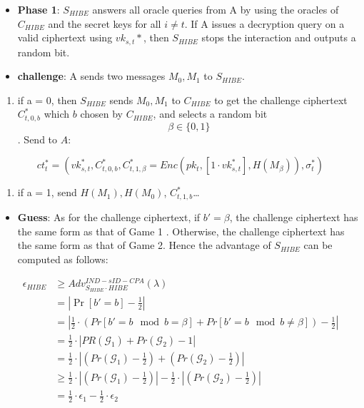 \documentclass[
]{article}
\providecommand{\tightlist}{%
  \setlength{\itemsep}{0pt}\setlength{\parskip}{0pt}}
\begin{document}
\begin{itemize}
\item
  \textbf{Phase 1}: \(S_{HIBE}\) answers all oracle queries from A by
  using the oracles of \(C_{HIBE}\) and the secret keys for all
  \(i \neq t\). If A issues a decryption query on a valid ciphertext
  using \(vk_{s,t}*\), then \(S_{HIBE}\) stops the interaction and
  outputs a random bit.
\item
  \textbf{challenge}: A sends two messages \(M_0, M_1\) to \(S_{HIBE}\).
\end{itemize}

\begin{enumerate}
\def\labelenumi{\arabic{enumi}.}
\tightlist
\item
  if a = 0, then \(S_{HIBE}\) sends \(M_0,M_1\) to \(C_{HIBE}\) to get
  the challenge ciphertext \(C_{t,0,b}^*\) which \(b\) chosen by
  \(C_{HIBE}\), and selects a random bit \[\beta \in \{0, 1\}\]. Send to
  \(A\):
\end{enumerate}

\[
ct_t^* = (vk_{s,t}^*, C_{t,0,b}^*, C_{t,1,\beta}^*= Enc(pk_t,[1\cdot vk_{s,t}^*],H(M_\beta)), \sigma_t^*)
\]

\begin{enumerate}
\def\labelenumi{\arabic{enumi}.}
\setcounter{enumi}{1}
\tightlist
\item
  if a = 1, send \(H(M_1), H(M_0)\), \(C_{t,1,b}^*\)\ldots{}
\end{enumerate}

\begin{itemize}
\tightlist
\item
  \textbf{Guess}: As for the challenge ciphertext, if \(b'=\beta\), the
  challenge ciphertext has the same form as that of Game 1 . Otherwise,
  the challenge ciphertext has the same form as that of Game 2. Hence
  the advantage of \(S_{HIBE}\) can be computed as follows:
\end{itemize}

\[
\begin{equation}
\begin{aligned}
\epsilon_{HIBE} &\ge Adv_{S_{HIBE}\cdot HIBE}^{IND-sID-CPA}(\lambda)\\
&= \left|\Pr[b' = b] - \frac{1}{2}\right|\\
&= \left|\frac{1}{2}\cdot(Pr[b'=b\mod b=\beta] + Pr[b'=b\mod b\neq \beta]) - \frac{1}{2}\right|\\
&= \frac{1}{2}\cdot\left|PR(\mathcal{G}_1)+ Pr(\mathcal{G}_2) - 1\right|\\
&= \frac{1}{2}\cdot\left|(Pr(\mathcal{G}_1)-\frac{1}{2}) + (Pr(\mathcal{G}_2)-\frac{1}{2})\right|\\
&\ge \frac{1}{2}\cdot\left|(Pr(\mathcal{G}_1)-\frac{1}{2})\right| - \frac{1}{2}\cdot\left|(Pr(\mathcal{G}_2)-\frac{1}{2})\right|\\
&= \frac{1}{2}\cdot\epsilon_1 - \frac{1}{2}\cdot\epsilon_2
\end{aligned}
\end{equation}
\]
\end{document}
